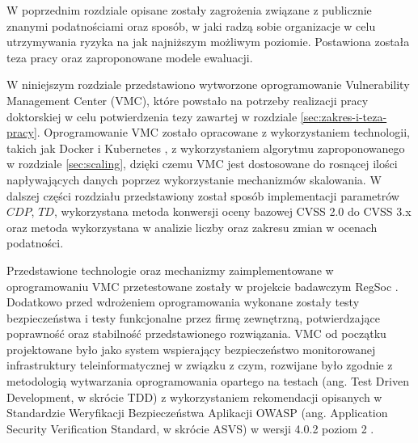 W poprzednim rozdziale opisane zostały zagrożenia związane z publicznie znanymi podatnościami oraz sposób, w jaki radzą sobie organizacje w celu utrzymywania ryzyka na jak najniższym możliwym poziomie. Postawiona została teza pracy oraz zaproponowane modele ewaluacji.

\bigbreak
W niniejszym rozdziale przedstawiono wytworzone oprogramowanie Vulnerability Management Center (VMC), które powstało na potrzeby realizacji pracy doktorskiej w celu potwierdzenia tezy zawartej w rozdziale \ref{sec:zakres-i-teza-pracy}. Oprogramowanie VMC zostało opracowane z wykorzystaniem technologii, takich jak Docker \cite{anderson2015docker} i Kubernetes \cite{chemashkinkubernetes}, z wykorzystaniem algorytmu zaproponowanego w rozdziale \ref{sec:scaling}, dzięki czemu VMC jest dostosowane do rosnącej ilości napływających danych poprzez wykorzystanie mechanizmów skalowania. W dalszej części rozdziału przedstawiony został sposób implementacji parametrów $CDP$, $TD$, wykorzystana metoda konwersji oceny bazowej CVSS 2.0 do CVSS 3.x oraz metoda wykorzystana w analizie liczby oraz zakresu zmian w ocenach podatności.

\bigbreak
Przedstawione technologie oraz mechanizmy zaimplementowane w oprogramowaniu VMC przetestowane zostały w projekcie badawczym RegSoc \cite{regsoc}. Dodatkowo przed wdrożeniem oprogramowania wykonane zostały testy bezpieczeństwa i testy funkcjonalne przez firmę zewnętrzną, potwierdzające poprawność oraz stabilność przedstawionego rozwiązania. VMC od początku projektowane było jako system wspierający bezpieczeństwo monitorowanej infrastruktury teleinformatycznej w związku z czym, rozwijane było zgodnie z metodologią wytwarzania oprogramowania opartego na testach (ang. Test Driven Development, w skrócie TDD) \cite{astels2003test} z wykorzystaniem rekomendacji opisanych w Standardzie Weryfikacji Bezpieczeństwa Aplikacji OWASP (ang. Application Security Verification Standard, w skrócie ASVS) w wersji 4.0.2 poziom 2 \cite{ASVS}.


